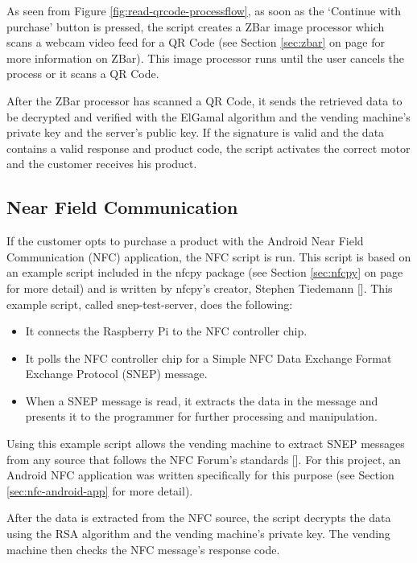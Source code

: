 As seen from Figure \ref{fig:read-qrcode-processflow}, as soon as the `Continue
with purchase' button is pressed, the script creates a ZBar image processor
which scans a webcam video feed for a QR Code (see Section \ref{sec:zbar} on page
\pageref{sec:zbar} for more information on ZBar). This image processor runs until the user
cancels the process or it scans a QR Code. 

After the ZBar processor has scanned a QR Code, it sends the retrieved data to
be decrypted and verified with the ElGamal algorithm and the vending machine's
private key and the server's public key. If the signature is valid and the data
contains a valid response and product code, the script activates the correct
motor and the customer receives his product. 

\subsection{Near Field Communication}

If the customer opts to purchase a product with the Android Near Field
Communication (NFC) application, the NFC script is run. This script is based on an
example script included in the nfcpy package (see Section \ref{sec:nfcpy} on page
\pageref{sec:nfcpy} for more detail) and is written by nfcpy's creator, Stephen Tiedemann
[\cite{website:nfcpy}]. This example script, called snep-test-server, does the
following:

\begin{itemize}
  \item It connects the Raspberry Pi to the NFC controller chip.
  \item It polls the NFC controller chip for a Simple NFC Data Exchange Format
  Exchange Protocol (SNEP) message.
  \item When a SNEP message is read, it extracts the data in the message and
  presents it to the programmer for further processing and manipulation.
\end{itemize}

Using this example script allows the vending machine to extract SNEP messages
from any source that follows the NFC Forum's standards
[\cite{website:nfc-forum}]. For this project, an Android NFC application was written
specifically for this purpose (see Section \ref{sec:nfc-android-app} for more
detail). 

After the data is extracted from the NFC source, the script decrypts the data
using the RSA algorithm and the vending machine's private key. The vending
machine then checks the NFC message's response code. 

